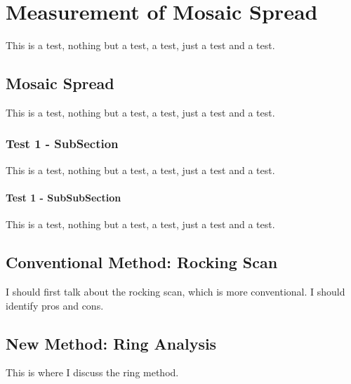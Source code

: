 \chapter{Measurement of Mosaic Spread}

This is a test, nothing but a test, a test, just a test and a test.

\section{Mosaic Spread}

This is a test, nothing but a test, a test, just a test and a test.

%


\subsection{Test 1 - SubSection}

This is a test, nothing but a test, a test, just a test and a test.

\subsubsection{Test 1 - SubSubSection}

This is a test, nothing but a test, a test, just a test and a test.

\section{Conventional Method: Rocking Scan}
I should first talk about the rocking scan, which is more conventional. I should identify pros and cons.

\section{New Method: Ring Analysis}
This is where I discuss the ring method.